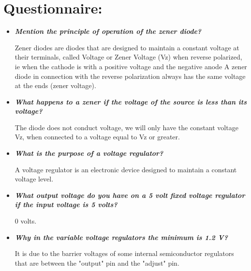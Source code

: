 \section{Questionnaire:}

\begin{itemize}
\item {\bfseries\itshape Mention the principle of operation of the zener diode?} \hfill \break 

Zener diodes are diodes that are designed to maintain a constant voltage at their terminals, called Voltage or Zener Voltage (Vz) when reverse polarized, ie when the cathode is with a positive voltage and the negative anode A zener diode in connection with the reverse polarization always has the same voltage at the ends (zener voltage). \hfill \break

\item {\bfseries\itshape What happens to a zener if the voltage of the source is less than its voltage?} \hfill \break

The diode does not conduct voltage, we will only have the constant voltage Vz, when connected to a voltage equal to Vz or greater. \hfill \break

\item {\bfseries\itshape What is the purpose of a voltage regulator?} \hfill \break

A voltage regulator is an electronic device designed to maintain a constant voltage level. \hfill \break

\item {\bfseries\itshape What output voltage do you have on a 5 volt fixed voltage regulator if the input voltage is 5 volts?} \hfill \break

0 volts. \hfill \break

\item {\bfseries\itshape Why in the variable voltage regulators the minimum is 1.2 V?} \hfill \break

It is due to the barrier voltages of some internal semiconductor regulators that are between the "output" pin and the "adjust" pin.
\end{itemize}

\pagebreak
